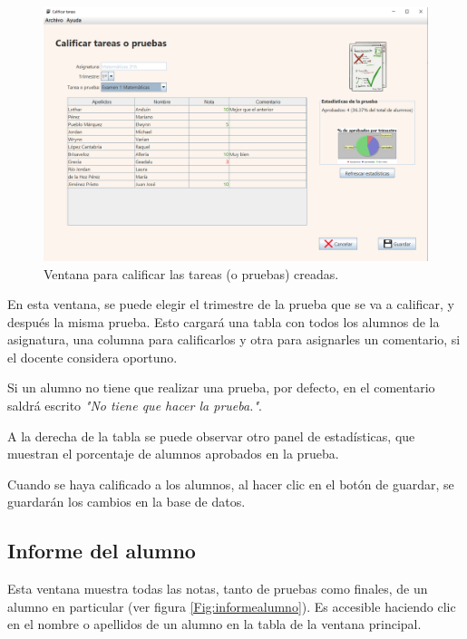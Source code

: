 \begin{figure}[h]
\centering\includegraphics[width=1\linewidth]{figs/calificartareas.png}
\caption{Ventana para calificar las tareas (o pruebas) creadas.}
\label{Fig:calificartarea}
\end{figure}

En esta ventana, se puede elegir el trimestre de la prueba que se va a calificar, y después la misma prueba. Esto cargará una tabla con todos los alumnos de la asignatura, una columna para calificarlos y otra para asignarles un comentario, si el docente considera oportuno.

Si un alumno no tiene que realizar una prueba, por defecto, en el comentario saldrá escrito \textit{"No tiene que hacer la prueba."}. 

A la derecha de la tabla se puede observar otro panel de estadísticas, que muestran el porcentaje de alumnos aprobados en la prueba.

Cuando se haya calificado a los alumnos, al hacer clic en el botón de guardar, se guardarán los cambios en la base de datos.

\subsection{Informe del alumno}
Esta ventana muestra todas las notas, tanto de pruebas como finales, de un alumno en particular (ver figura \ref{Fig:informealumno}). Es accesible haciendo clic en el nombre o apellidos de un alumno en la tabla de la ventana principal.

